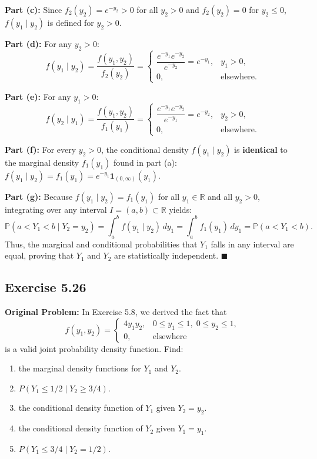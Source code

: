 \documentclass[11pt, letterpaper]{article}
\theoremstyle{definition}
\theoremstyle{remark}
\newcommand{\Prob}{\mathbb{P}}
\begin{document}
\textbf{Part (c):} Since $f_2(y_2) = e^{-y_2} > 0$ for all $y_2 > 0$ and $f_2(y_2) = 0$ for $y_2 \le 0$, $f(y_1 \mid y_2)$ is defined for $y_2 > 0$.

\textbf{Part (d):} For any $y_2 > 0$:
\[ f(y_1 \mid y_2) = \frac{f(y_1, y_2)}{f_2(y_2)} = \begin{cases} \dfrac{e^{-y_1}e^{-y_2}}{e^{-y_2}} = e^{-y_1}, & y_1 > 0, \\ 0, & \text{elsewhere.} \end{cases} \]

\textbf{Part (e):} For any $y_1 > 0$:
\[ f(y_2 \mid y_1) = \frac{f(y_1, y_2)}{f_1(y_1)} = \begin{cases} \dfrac{e^{-y_1}e^{-y_2}}{e^{-y_1}} = e^{-y_2}, & y_2 > 0, \\ 0, & \text{elsewhere.} \end{cases} \]

\textbf{Part (f):} For every $y_2 > 0$, the conditional density $f(y_1 \mid y_2)$ is \textbf{identical} to the marginal density $f_1(y_1)$ found in part (a): $f(y_1 \mid y_2) = f_1(y_1) = e^{-y_1} \mathbf{1}_{(0, \infty)}(y_1)$.

\textbf{Part (g):} Because $f(y_1 \mid y_2) = f_1(y_1)$ for all $y_1 \in \mathbb{R}$ and all $y_2 > 0$, integrating over any interval $I = (a, b) \subset \mathbb{R}$ yields:
\[ \Prob(a < Y_1 < b \mid Y_2 = y_2) = \int_a^b f(y_1 \mid y_2) \, dy_1 = \int_a^b f_1(y_1) \, dy_1 = \Prob(a < Y_1 < b). \]
Thus, the marginal and conditional probabilities that $Y_1$ falls in any interval are equal, proving that $Y_1$ and $Y_2$ are statistically independent. $\blacksquare$

\subsection{Exercise 5.26}

\textbf{Original Problem:}
In Exercise 5.8, we derived the fact that
\[ f(y_1, y_2) = \begin{cases} 4y_1 y_2, & 0 \le y_1 \le 1, \; 0 \le y_2 \le 1, \\ 0, & \text{elsewhere} \end{cases} \]
is a valid joint probability density function. Find:
\begin{enumerate}[label=\textbf{\alph*}]
    \item the marginal density functions for $Y_1$ and $Y_2$.
    \item $P(Y_1 \le 1/2 \mid Y_2 \ge 3/4)$.
    \item the conditional density function of $Y_1$ given $Y_2 = y_2$.
    \item the conditional density function of $Y_2$ given $Y_1 = y_1$.
    \item $P(Y_1 \le 3/4 \mid Y_2 = 1/2)$.
\end{enumerate}
\end{document}
